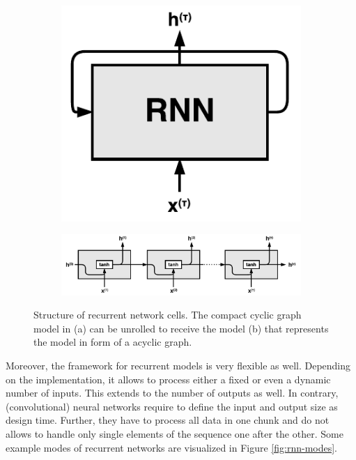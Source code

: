 \begin{figure}[htpb]
\centering
\begin{subfigure}{0.25\textwidth}
  \centering
  \includegraphics[scale=0.5]{figures/rnn_loop.pdf}
  \caption{}
  \label{fig:rnn-loop}
\end{subfigure}%
\begin{subfigure}{0.75\textwidth}
  \centering
  \includegraphics[scale=0.5]{figures/rnn_unrolled.pdf}
  \caption{}
  \label{fig:rnn-unrolled}
\end{subfigure}
\caption[Structure of RNN cells]{Structure of recurrent network cells. The compact cyclic graph model in (a) can be unrolled to receive the model (b) that represents the model in form of a acyclic graph.}
\label{fig:rnn}
\end{figure}

Moreover, the framework for recurrent models is very flexible as well. Depending on the implementation, it allows to process either a fixed or even a dynamic number of inputs. This extends to the number of outputs as well. In contrary, (convolutional) neural networks require to define the input and output size as design time. Further, they have to process all data in one chunk and do not allows to handle only single elements of the sequence one after the other. Some example modes of recurrent networks are visualized in Figure \ref{fig:rnn-modes}.

